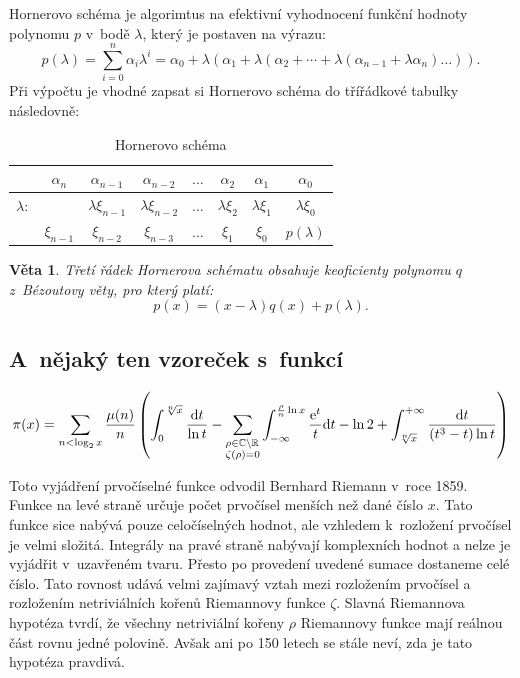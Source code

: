 \documentclass[a4paper,11pt]{article}
\newtheorem{sent}{Věta}
\begin{document}
Hornerovo schéma je algorimtus na efektivní vyhodnocení funkční hodnoty polynomu $p$ v~bodě $\lambda$, který je postaven na výrazu:
$$p(\lambda) = \sum_{i=0}^n \alpha_i \lambda^i = \alpha_0 + \lambda (\alpha_1 + \lambda (\alpha_2 + \cdots + \lambda(\alpha_{n-1} + \lambda \alpha_n) \dots)).$$
Při výpočtu je vhodné zapsat si Hornerovo schéma do třířádkové tabulky následovně:
\begin{table}[h]
	\begin{center}
		\begin{tabular}{c|c|c|c|c|c|c|c}
		& $\alpha_n$ & $\alpha_{n-1}$ & $\alpha_{n-2}$ & $\dots$ & $\alpha_2$ & $\alpha_1$ & $\alpha_0$ \\ \hline
		$\lambda:$ & & $\lambda \xi_{n-1}$ & $\lambda \xi_{n-2}$ & $\dots$ & $\lambda \xi_2$ & $\lambda \xi_1$ & $\lambda \xi_0$ \\ \hline
		& $\xi_{n-1}$ & $\xi_{n-2}$ & $\xi_{n-3}$ & $\dots$ & $\xi_1$ & $\xi_0$ & $p(\lambda)$
		\end{tabular}
		\caption{Hornerovo schéma}
	\end{center}
\end{table}

\begin{sent}
Třetí řádek Hornerova schématu obsahuje keoficienty polynomu $q$ z~Bézoutovy věty, pro který platí:
$$p(x) = (x - \lambda)q(x) + p(\lambda).$$
\end{sent}

\subsection{A~nějaký ten vzoreček s~funkcí}

$$\pi(x) = \sum_{n < \log_2{x}} \frac{\mu(n)}{n} \left( \int_0^{\sqrt[n]{x}}\frac{\mathrm{d}t}{\ln{t}} - \sum_{\begin{subarray}{l}\rho \in \mathbb{C} \setminus \mathbb{R} \\ \zeta(\rho) = 0\end{subarray}} \int_{-\infty}^{\frac{\rho}{n}\ln{x}} \frac{\mathrm{e}^t}{t} \mathrm{d}t - \ln{2} + \int_{\sqrt[n]{x}}^{+\infty} \frac{\mathrm{d}t}{(t^3 - t) \ln{t}} \right)$$

Toto vyjádření prvočíselné funkce odvodil Bernhard Riemann v~roce 1859. Funkce na levé straně určuje počet prvočísel menších než dané číslo $x$. Tato funkce sice nabývá pouze celočíselných hodnot, ale vzhledem k~rozložení prvočísel je velmi složitá. Integrály na pravé straně nabývají komplexních hodnot a nelze je vyjádřit v~uzavřeném tvaru. Přesto po provedení uvedené sumace dostaneme celé číslo. Tato rovnost udává velmi zajímavý vztah mezi rozložením prvočísel a rozložením netriviálních kořenů Riemannovy funkce $\zeta$. Slavná Riemannova hypotéza tvrdí, že všechny netriviální kořeny $\rho$ Riemannovy funkce mají reálnou část rovnu jedné polovině. Avšak ani po 150 letech se stále neví, zda je tato hypotéza pravdivá.
\end{document}
